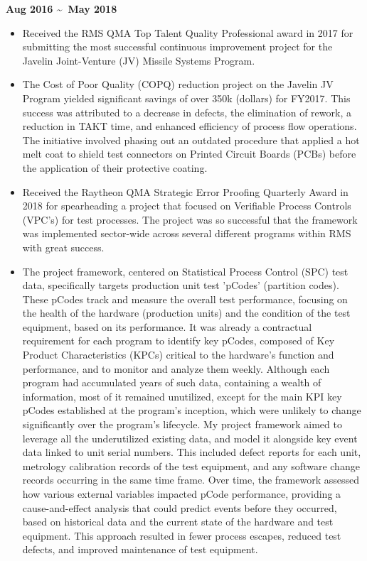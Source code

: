 \documentclass[AutoFakeBold]{resume}
\begin{document}
 {\textbf{Aug 2016 \textasciitilde \ May 2018}}
\begin{itemize}
    \item Received the RMS QMA Top Talent Quality Professional award in 2017 for submitting the most successful continuous improvement project for the Javelin Joint-Venture (JV) Missile Systems Program. 
    \item The Cost of Poor Quality (COPQ) reduction project on the Javelin JV Program yielded significant savings of over 350k (dollars) for FY2017. This success was attributed to a decrease in defects, the elimination of rework, a reduction in TAKT time, and enhanced efficiency of process flow operations. The initiative involved phasing out an outdated procedure that applied a hot melt coat to shield test connectors on Printed Circuit Boards (PCBs) before the application of their protective coating.
    \item Received the Raytheon QMA Strategic Error Proofing Quarterly Award in 2018 for spearheading a project that focused on Verifiable Process Controls (VPC's) for test processes. The project was so successful that the framework was implemented sector-wide across several different programs within RMS with great success.
    \item The project framework, centered on Statistical Process Control (SPC) test data, specifically targets production unit test 'pCodes' (partition codes). These pCodes track and measure the overall test performance, focusing on the health of the hardware (production units) and the condition of the test equipment, based on its performance. It was already a contractual requirement for each program to identify key pCodes, composed of Key Product Characteristics (KPCs) critical to the hardware's function and performance, and to monitor and analyze them weekly. Although each program had accumulated years of such data, containing a wealth of information, most of it remained unutilized, except for the main KPI key pCodes established at the program's inception, which were unlikely to change significantly over the program's lifecycle. My project framework aimed to leverage all the underutilized existing data, and model it alongside key event data linked to unit serial numbers. This included defect reports for each unit, metrology calibration records of the test equipment, and any software change records occurring in the same time frame. Over time, the framework assessed how various external variables impacted pCode performance, providing a cause-and-effect analysis that could predict events before they occurred, based on historical data and the current state of the hardware and test equipment. This approach resulted in fewer process escapes, reduced test defects, and improved maintenance of test equipment.

\end{itemize}
\end{document}
